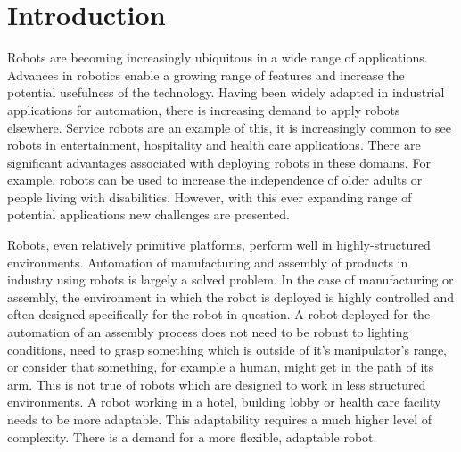 
%
%
%   

\chapter{Introduction}

Robots are becoming increasingly ubiquitous in a wide range of applications. Advances in robotics enable a growing range of features and increase the potential usefulness of the technology. Having been widely adapted in industrial applications for automation, there is increasing demand to apply robots elsewhere. Service robots are an example of this, it is increasingly common to see robots in entertainment, hospitality and health care applications. There are significant advantages associated with deploying robots in these domains. For example, robots can be used to increase the independence of older adults or people living with disabilities. However, with this ever expanding range of potential applications new challenges are presented. 


Robots, even relatively primitive platforms, perform well in highly-structured environments. Automation of manufacturing and assembly of products in industry using robots is largely a solved problem. In the case of manufacturing or assembly, the environment in which the robot is deployed is highly controlled and often designed specifically for the robot in question. A robot deployed for the automation of an assembly process does not need to be robust to lighting conditions, need to grasp something which is outside of it's manipulator's range, or consider that something, for example a human, might get in the path of its arm. This is not true of robots which are designed to work in less structured environments. A robot working in a hotel, building lobby or health care facility needs to be more adaptable. This adaptability requires a much higher level of complexity. There is a demand for a more flexible, adaptable robot.  


